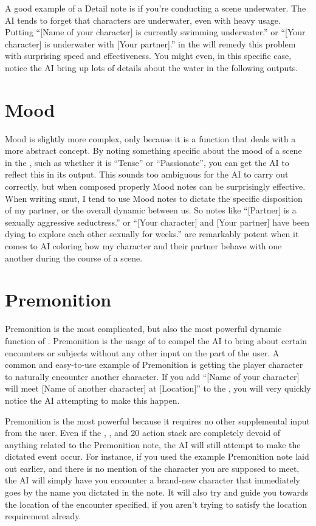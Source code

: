 \documentclass[Source-main.tex]{subfiles}
\begin{document}
A good example of a Detail note is if you’re conducting a scene underwater.
The AI tends to forget that characters are underwater, even with heavy \rem usage.
Putting “[Name of your character] is currently swimming underwater.” or “[Your character] is underwater with [Your partner].” in the \an will remedy this problem with surprising speed and effectiveness.
You might even, in this specific case, notice the AI bring up lots of details about the water in the following outputs.

\section{Mood}

Mood is slightly more complex, only because it is a function that deals with a more abstract concept.
By noting something specific about the mood of a scene in the \an, such as whether it is “Tense” or “Passionate”, you can get the AI to reflect this in its output.
This sounds too ambiguous for the AI to carry out correctly, but when composed properly Mood notes can be surprisingly effective.
When writing smut, I tend to use Mood notes to dictate the specific disposition of my partner, or the overall dynamic between us.
So notes like “[Partner] is a sexually aggressive seductress.” or “[Your character] and [Your partner] have been dying to explore each other sexually for weeks.” are remarkably potent when it comes to AI coloring how my character and their partner behave with one another during the course of a scene.

\section{Premonition}

Premonition is the most complicated, but also the most powerful dynamic function of \an.
Premonition is the usage of \an to compel the AI to bring about certain encounters or subjects without any other input on the part of the user.
A common and easy-to-use example of Premonition is getting the player character to naturally encounter another character.
If you add “[Name of your character] will meet [Name of another character] at [Location]” to the \an, you will very quickly notice the AI attempting to make this happen.

Premonition is the most powerful because it requires no other supplemental input from the user.
Even if the \rem, \wi, and 20 action stack are completely devoid of anything related to the Premonition note, the AI will still attempt to make the dictated event occur.
For instance, if you used the example Premonition note laid out earlier, and there is no mention of the character you are supposed to meet, the AI will simply have you encounter a brand-new character that immediately goes by the name you dictated in the note.
It will also try and guide you towards the location of the encounter specified, if you aren’t trying to satisfy the location requirement already.
\end{document}
